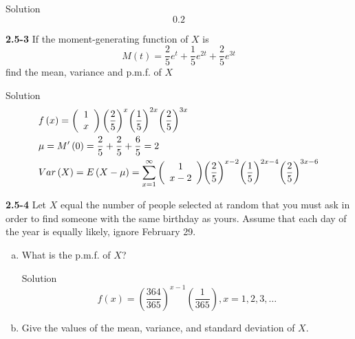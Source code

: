 \documentclass{article}
\begin{document}
\begin{spacing}{1.1}
\begin{homeworkProblem}
\begin{enumerate}[(a)]
\begin{enumerate}[(i)]
\begin{homeworkSection}{Solution}
						\[0.2\]
					\end{homeworkSection}
			\end{enumerate}
	\end{enumerate}
\end{homeworkProblem}
\begin{homeworkProblem}
	{\bf 2.5-3}	If the moment-generating function of $X$ is 
	\[M(t) = \frac{2}{5}{e^t} + \frac{1}{5}{e^{2t}} + \frac{2}{5}{e^{3t}}\]
	find the mean, variance and p.m.f. of $X$
	\begin{homeworkSection}{Solution}
		\[\begin{gathered}
  f\left( x \right) = \left( {\begin{array}{*{20}{c}}
  1 \\ 
  x 
\end{array}} \right){\left( {\frac{2}{5}} \right)^x}{\left( {\frac{1}{5}} \right)^{2x}}{\left( {\frac{2}{5}} \right)^{3x}} \hfill \\
  \mu  = M'\left( 0 \right) = \frac{2}{5} + \frac{2}{5} + \frac{6}{5} = 2 \hfill \\
  Var\left( X \right) = E\left( {X - \mu } \right) = \sum\limits_{x = 1}^\infty  {\left( {\begin{array}{*{20}{c}}
  1 \\ 
  {x - 2} 
\end{array}} \right)} {\left( {\frac{2}{5}} \right)^{x - 2}}{\left( {\frac{1}{5}} \right)^{2x - 4}}{\left( {\frac{2}{5}} \right)^{3x - 6}} \hfill \\ 
\end{gathered} \]
	\end{homeworkSection}
\end{homeworkProblem}
\begin{homeworkProblem}
	{\bf 2.5-4}	Let $X$ equal the number of people selected at random that you must ask in order to find someone with the same birthday as yours.  Assume that each day of the year is equally likely, ignore February 29.  
	\begin{enumerate}[(a)]
		\item What is the p.m.f. of $X$?
			\begin{homeworkSection}{Solution}
				\[f\left( x \right) = {\left( {\frac{{364}}{{365}}} \right)^{x - 1}}\left( {\frac{1}{{365}}} \right),x = 1,2,3, \ldots \]
			\end{homeworkSection}
		\item Give the values of the mean, variance, and standard deviation of $X$.

\end{enumerate}
\end{homeworkProblem}
\end{spacing}
\end{document}
